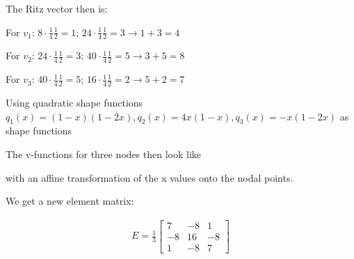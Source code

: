 The Ritz vector then is:

For $v_1$: $8\cdot\frac{1}{4}\frac{1}{2} = 1$; $24\cdot \frac{1}{4}\frac{1}{2} = 3\rightarrow 1+3=4$

For $v_2$: $24\cdot\frac{1}{4}\frac{1}{2} = 3$; $40\cdot \frac{1}{4}\frac{1}{2} = 5\rightarrow 3+5=8$

For $v_3$: $40\cdot\frac{1}{4}\frac{1}{2} = 5$; $16\cdot \frac{1}{4}\frac{1}{2} = 2\rightarrow 5+2=7$


Using quadratic shape functions $q_1(x) = (1-x)(1-2x), q_2(x) = 4x(1-x), q_3(x) = -x(1-2x)$ as shape functions


The v-functions for three nodes then look like


with an affine transformation of the x values onto the nodal points.

We get a new element matrix:
\begin{snugshade*}
    \begin{align*}
        E = \frac{1}{3}
        \begin{bmatrix}
            7 & -8 & 1 \\
            -8 & 16 & -8 \\
            1 & -8 & 7
        \end{bmatrix}
    \end{align*}
\end{snugshade*}

